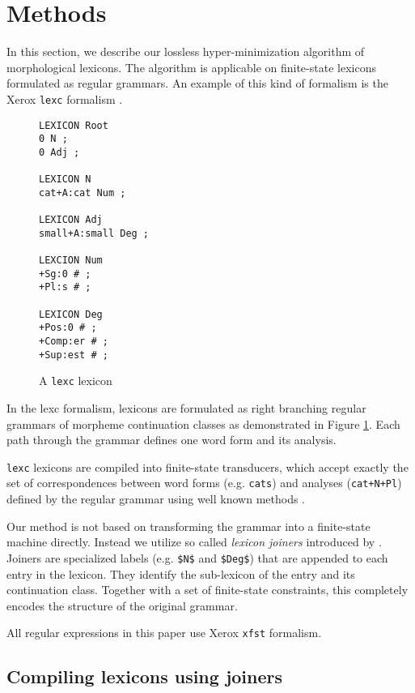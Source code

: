 \documentclass[11pt]{article}
\begin{document}
\section{Methods}\label{sec:methods}

In this section, we describe our lossless hyper-minimization algorithm
of morphological lexicons. The algorithm is applicable on finite-state
lexicons formulated as regular grammars. An example of this kind of
formalism is the Xerox {\tt lexc} formalism \cite{beesley2003finite}.

\begin{figure}
\begin{small}
\begin{verbatim}
LEXICON Root
0 N ;
0 Adj ;

LEXICON N
cat+A:cat Num ;

LEXICON Adj
small+A:small Deg ;

LEXCION Num
+Sg:0 # ;
+Pl:s # ;

LEXICON Deg
+Pos:0 # ;
+Comp:er # ;
+Sup:est # ; 
\end{verbatim}
\end{small}
\caption{A {\tt lexc} lexicon}\label{fig:lexc}
\end{figure}

In the lexc formalism, lexicons are formulated as right branching
regular grammars of morpheme continuation classes as demonstrated in
Figure \ref{fig:lexc}. Each path through the grammar defines one word form
and its analysis. 

{\tt lexc} lexicons are compiled into finite-state transducers, which
accept exactly the set of correspondences between word forms
(e.g. {\tt cats}) and analyses ({\tt cat+N+Pl}) defined by the regular
grammar using well known methods \cite{hopcroft2006}.

Our method is not based on transforming the grammar into a finite-state
machine directly. Instead we utilize so called {\it lexicon joiners}
introduced by \cite{linden2009}. Joiners are specialized labels
(e.g. {\tt \$N\$} and {\tt \$Deg\$}) that are appended to each
entry in the lexicon. They identify the sub-lexicon of the entry and
its continuation class. Together with a set of finite-state
constraints, this completely encodes the structure of the original
grammar.

All regular expressions in this paper use Xerox {\tt xfst} formalism.

\subsection{Compiling lexicons using joiners}
\end{document}
